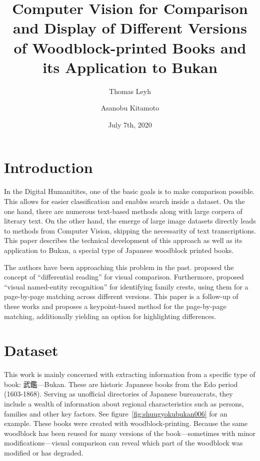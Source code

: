 \documentclass{ltjarticle}
\title{Computer Vision for Comparison and Display of Different Versions of Woodblock-printed Books and its Application to Bukan}
\author[1,3]{Thomas Leyh}
\author[2,3]{Asanobu Kitamoto}
\affil[1]{University of Freiburg}
\affil[2]{ROIS-DS Center for Open Data in the Humanities}
\affil[3]{National Institute of Informatics}
\date{July 7th, 2020}
\begin{document}
\maketitle

\section{Introduction}

In the Digital Humanitites, one of the basic goals is to make comparison possible. This allows for easier classification and enables search inside a dataset. On the one hand, there are numerous text-based methods along with large corpera of literary text. On the other hand, the emerge of large image datasets directly leads to methods from Computer Vision, skipping the necessarity of text transcriptions. This paper describes the technical development of this approach as well as its application to Bukan, a special type of Japanese woodblock printed books.

The authors have been approaching this problem in the past. \cite{kitamoto2018} proposed the concept of “differential reading” for visual comparison. Furthermore, \cite{hakim2019} proposed “visual named-entity recognition” for identifying family crests, using them for a page-by-page matching across different versions. This paper is a follow-up of these works and proposes a keypoint-based method for the page-by-page matching, additionally yielding an option for highlighting differences. 

\section{Dataset}

This work is mainly concerned with extracting information from a specific type of book: 武鑑---Bukan. These are historic Japanese books from the Edo period (1603-1868). Serving as unofficial directories of Japanese bureaucrats, they include a wealth of information about regional characteristics such as persons, families and other key factors. See figure~\ref{fig:shuugyokubukan006} for an example. These books were created with woodblock-printing. Because the same woodblock has been reused for many versions of the book---sometimes with minor modifications---visual comparison can reveal which part of the woodblock was modified or has degraded.
\end{document}
